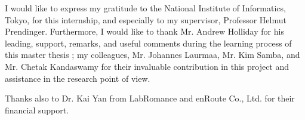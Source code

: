 
\vspace*{3cm}

\begin{changemargin}{2.2cm}{2.2cm}

I would like to express my gratitude to the National Institute of
Informatics, Tokyo, for this internship, and especially to my supervisor, Professor Helmut Prendinger. Furthermore, I would like to thank Mr. Andrew Holliday for his leading, support, remarks, and useful comments during the learning process of this master thesis ; my colleagues, Mr. Johannes Laurmaa, Mr. Kim Samba, and Mr. Chetak Kandaswamy for their invaluable contribution in this project and assistance in the research point of view.

Thanks also to Dr. Kai Yan from LabRomance and enRoute Co., Ltd. for their financial support.

\end{changemargin}
